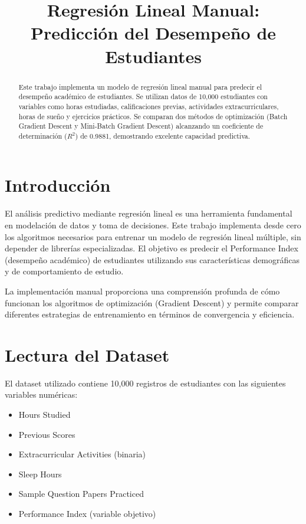 \documentclass[conference]{IEEEtran}
\begin{document}
\title{Regresión Lineal Manual: Predicción del Desempeño de Estudiantes}

\author{
}

\maketitle

\begin{abstract}
Este trabajo implementa un modelo de regresión lineal manual para predecir el desempeño académico de estudiantes. Se utilizan datos de 10,000 estudiantes con variables como horas estudiadas, calificaciones previas, actividades extracurriculares, horas de sueño y ejercicios prácticos. Se comparan dos métodos de optimización (Batch Gradient Descent y Mini-Batch Gradient Descent) alcanzando un coeficiente de determinación ($R^2$) de 0.9881, demostrando excelente capacidad predictiva.
\end{abstract}

\section{Introducción}

El análisis predictivo mediante regresión lineal es una herramienta fundamental en modelación de datos y toma de decisiones. Este trabajo implementa desde cero los algoritmos necesarios para entrenar un modelo de regresión lineal múltiple, sin depender de librerías especializadas. El objetivo es predecir el Performance Index (desempeño académico) de estudiantes utilizando sus características demográficas y de comportamiento de estudio.

La implementación manual proporciona una comprensión profunda de cómo funcionan los algoritmos de optimización (Gradient Descent) y permite comparar diferentes estrategias de entrenamiento en términos de convergencia y eficiencia.

\section{Lectura del Dataset}

El dataset utilizado contiene 10,000 registros de estudiantes con las siguientes variables numéricas:

\begin{itemize}
\item Hours Studied
\item Previous Scores
\item Extracurricular Activities (binaria)
\item Sleep Hours
\item Sample Question Papers Practiced
\item Performance Index (variable objetivo)
\end{itemize}
\end{document}
